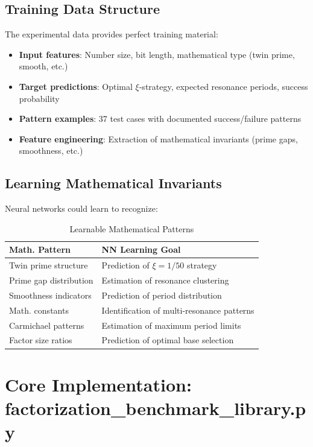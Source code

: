 	\subsection{Training Data Structure}
	
	The experimental data provides perfect training material:
	
	\begin{itemize}
		\item \textbf{Input features}: Number size, bit length, mathematical type (twin prime, smooth, etc.)
		\item \textbf{Target predictions}: Optimal $\xi$-strategy, expected resonance periods, success probability
		\item \textbf{Pattern examples}: 37 test cases with documented success/failure patterns
		\item \textbf{Feature engineering}: Extraction of mathematical invariants (prime gaps, smoothness, etc.)
	\end{itemize}
	
	\subsection{Learning Mathematical Invariants}
	
	Neural networks could learn to recognize:
	
	\begin{table}[H]
		\centering
		\caption{Learnable Mathematical Patterns}
		\begin{tabular}{ll}
			\toprule
			\textbf{Math. Pattern} & \textbf{NN Learning Goal} \\
			\midrule
			Twin prime structure & Prediction of $\xi = 1/50$ strategy \\
			Prime gap distribution & Estimation of resonance clustering \\
			Smoothness indicators & Prediction of period distribution \\
			Math. constants & Identification of multi-resonance patterns \\
			Carmichael patterns & Estimation of maximum period limits \\
			Factor size ratios & Prediction of optimal base selection \\
			\bottomrule
		\end{tabular}
		\label{tab:learnable_patterns}
	\end{table}
	
	\section{Core Implementation: factorization\_benchmark\_library.py}
	

